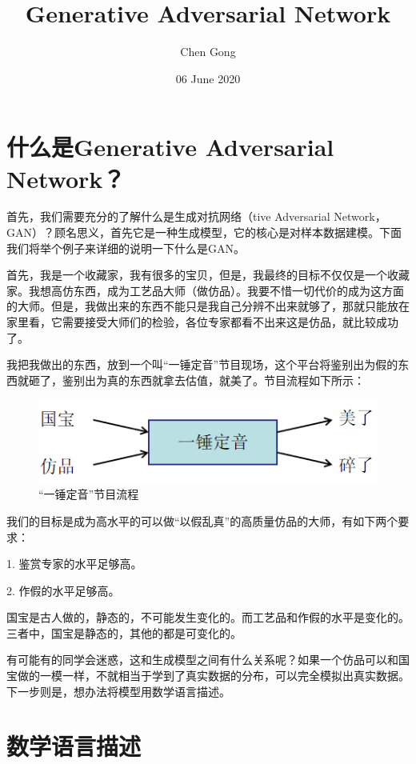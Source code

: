 \documentclass[a4paper]{article}
\title{Generative Adversarial Network}
\author{Chen Gong}
\date{06 June 2020}
\begin{document}
\maketitle
\tableofcontents
\newpage
\setcounter{page}{1} %
\clearpage
\maketitle

\section{什么是Generative Adversarial Network？}
首先，我们需要充分的了解什么是生成对抗网络（tive Adversarial Network，GAN）？顾名思义，首先它是一种生成模型，它的核心是对样本数据建模。下面我们将举个例子来详细的说明一下什么是GAN。

首先，我是一个收藏家，我有很多的宝贝，但是，我最终的目标不仅仅是一个收藏家。我想高仿东西，成为工艺品大师（做仿品）。我要不惜一切代价的成为这方面的大师。但是，我做出来的东西不能只是我自己分辨不出来就够了，那就只能放在家里看，它需要接受大师们的检验，各位专家都看不出来这是仿品，就比较成功了。

我把我做出的东西，放到一个叫“一锤定音”节目现场，这个平台将鉴别出为假的东西就砸了，鉴别出为真的东西就拿去估值，就美了。节目流程如下所示：
\begin{figure}[H]
    \centering
    \includegraphics[width=.55\textwidth]{微信图片_20200606153824.png}
    \caption{“一锤定音”节目流程}
    \label{fig:my_label_1}
\end{figure}
我们的目标是成为高水平的可以做“以假乱真”的高质量仿品的大师，有如下两个要求：

1. 鉴赏专家的水平足够高。

2. 作假的水平足够高。

国宝是古人做的，静态的，不可能发生变化的。而工艺品和作假的水平是变化的。三者中，国宝是静态的，其他的都是可变化的。

有可能有的同学会迷惑，这和生成模型之间有什么关系呢？如果一个仿品可以和国宝做的一模一样，不就相当于学到了真实数据的分布，可以完全模拟出真实数据。下一步则是，想办法将模型用数学语言描述。

\section{数学语言描述}
\end{document}
